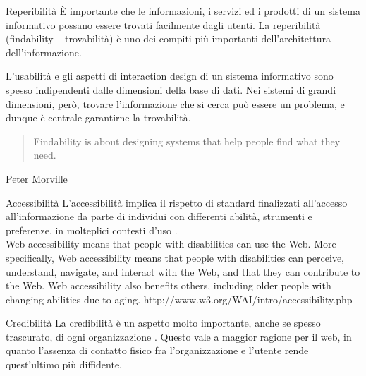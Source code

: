 \documentclass[pdf,mpa]{prosper}
\begin{document}
\begin{slide}{Reperibilità}
È importante che le informazioni, i servizi ed i prodotti di un sistema informativo possano essere trovati facilmente dagli utenti. La reperibilità (findability -- trovabilità) è uno dei compiti più importanti dell'architettura dell'informazione.

L'usabilità e gli aspetti di interaction design di un sistema informativo sono spesso indipendenti dalle dimensioni della base di dati. Nei sistemi di grandi dimensioni, però, trovare l'informazione che si cerca può essere un problema, e dunque è centrale garantirne la trovabilità.

\begin{quote}
Findability is about designing systems that help people find what they need.
\end{quote}
Peter Morville
\end{slide}

\begin{slide}{Accessibilità}
L'accessibilità implica il rispetto di standard finalizzati all'accesso all'informazione da parte di individui con differenti abilità, strumenti e preferenze, in molteplici contesti d'uso \citep{Lazar2004}.\\


Web accessibility means that people with disabilities can use the Web. More specifically, Web accessibility means that people with disabilities can perceive, understand, navigate, and interact with the Web, and that they can contribute to the Web. Web accessibility also benefits others, including older people with changing abilities due to aging.
http://www.w3.org/WAI/intro/accessibility.php


\end{slide}

\begin{slide}{Credibilità}
La credibilità è un aspetto molto importante, anche se spesso trascurato, di ogni organizzazione \citep{fogg2001}. Questo vale a maggior ragione per il web, in quanto l'assenza di contatto fisico fra l'organizzazione e l'utente rende quest'ultimo più diffidente.

\end{slide}
\end{document}
